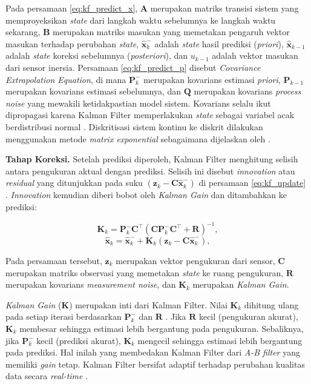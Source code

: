 Pada persamaan \eqref{eq:kf_predict_x}, $\mathbf{A}$ merupakan matriks transisi sistem yang memproyeksikan \emph{state} dari langkah waktu sebelumnya ke langkah waktu sekarang, $\mathbf{B}$ merupakan matriks masukan yang memetakan pengaruh vektor masukan terhadap perubahan \emph{state}, $\hat{\mathbf{x}}_k^-$ adalah \emph{state} hasil prediksi (\emph{priori}), $\hat{\mathbf{x}}_{k-1}$ adalah \emph{state} koreksi sebelumnya (\emph{posteriori}), dan $u_{k-1}$ adalah vektor masukan dari sensor inersia.
Persamaan \eqref{eq:kf_predict_p} disebut \emph{Covariance Extrapolation Equation}, di mana $\mathbf{P}_k^-$ merupakan kovarians estimasi \emph{priori}, $\mathbf{P}_{k-1}$ merupakan kovarians estimasi sebelumnya, dan $\mathbf{Q}$ merupakan kovarians \emph{process noise} yang mewakili ketidakpastian model sistem. Kovarians selalu ikut dipropagasi karena Kalman Filter memperlakukan \emph{state} sebagai variabel acak berdistribusi normal \parencite{Becker2024KF}.
Diskritisasi sistem kontinu ke diskrit dilakukan menggunakan metode \emph{matrix exponential} sebagaimana dijelaskan oleh \textcite{Dahdah2025}.

\textbf{Tahap Koreksi.} Setelah prediksi diperoleh, Kalman Filter menghitung selisih antara pengukuran aktual dengan prediksi. Selisih ini disebut \emph{innovation} atau \emph{residual} yang ditunjukkan pada suku $(\mathbf{z}_k - \mathbf{C} \hat{\mathbf{x}}_k^-)$ di persamaan \eqref{eq:kf_update} \parencite{Barfoot2017}. \emph{Innovation} kemudian diberi bobot oleh \emph{Kalman Gain} dan ditambahkan ke prediksi:

\begin{equation}
  \mathbf{K}_k = \mathbf{P}_k^- \mathbf{C}^\top (\mathbf{C} \mathbf{P}_k^- \mathbf{C}^\top + \mathbf{R})^{-1},
  \label{eq:kf_gain}
\end{equation}
\begin{equation}
  \hat{\mathbf{x}}_k = \hat{\mathbf{x}}_k^- + \mathbf{K}_k (\mathbf{z}_k - \mathbf{C} \hat{\mathbf{x}}_k^-),
  \label{eq:kf_update}
\end{equation}

Pada persamaan tersebut, $\mathbf{z}_k$ merupakan vektor pengukuran dari sensor, $\mathbf{C}$ merupakan matriks observasi yang memetakan \emph{state} ke ruang pengukuran, $\mathbf{R}$ merupakan kovarians \emph{measurement noise}, dan $\mathbf{K}_k$ merupakan \emph{Kalman Gain}.

\emph{Kalman Gain} ($\mathbf{K}$) merupakan inti dari Kalman Filter.
Nilai $\mathbf{K}_k$ dihitung ulang pada setiap iterasi berdasarkan $\mathbf{P}_k^-$ dan $\mathbf{R}$ \parencite{Becker2024KF}.
Jika $\mathbf{R}$ kecil (pengukuran akurat), $\mathbf{K}_k$ membesar sehingga estimasi lebih bergantung pada pengukuran.
Sebaliknya, jika $\mathbf{P}_k^-$ kecil (prediksi akurat), $\mathbf{K}_k$ mengecil sehingga estimasi lebih bergantung pada prediksi.
Hal inilah yang membedakan Kalman Filter dari \emph{A-B filter} yang memiliki \emph{gain} tetap.
Kalman Filter bersifat adaptif terhadap perubahan kualitas data secara \emph{real-time} \parencite{Becker2024KF}.

